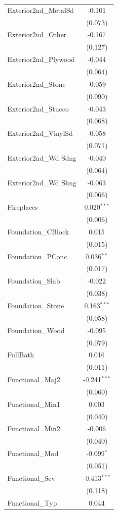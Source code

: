\begin{table}[!htbp]
\begin{tabular}{@{\extracolsep{5pt}}lc}
 Exterior2nd_MetalSd & -0.101$^{}$ \\
& (0.073) \\
 Exterior2nd_Other & -0.167$^{}$ \\
& (0.127) \\
 Exterior2nd_Plywood & -0.044$^{}$ \\
& (0.064) \\
 Exterior2nd_Stone & -0.059$^{}$ \\
& (0.090) \\
 Exterior2nd_Stucco & -0.043$^{}$ \\
& (0.068) \\
 Exterior2nd_VinylSd & -0.058$^{}$ \\
& (0.071) \\
 Exterior2nd_Wd Sdng & -0.040$^{}$ \\
& (0.064) \\
 Exterior2nd_Wd Shng & -0.063$^{}$ \\
& (0.066) \\
 Fireplaces & 0.020$^{***}$ \\
& (0.006) \\
 Foundation_CBlock & 0.015$^{}$ \\
& (0.015) \\
 Foundation_PConc & 0.036$^{**}$ \\
& (0.017) \\
 Foundation_Slab & -0.022$^{}$ \\
& (0.038) \\
 Foundation_Stone & 0.163$^{***}$ \\
& (0.058) \\
 Foundation_Wood & -0.095$^{}$ \\
& (0.079) \\
 FullBath & 0.016$^{}$ \\
& (0.011) \\
 Functional_Maj2 & -0.241$^{***}$ \\
& (0.060) \\
 Functional_Min1 & 0.003$^{}$ \\
& (0.040) \\
 Functional_Min2 & -0.006$^{}$ \\
& (0.040) \\
 Functional_Mod & -0.099$^{*}$ \\
& (0.051) \\
 Functional_Sev & -0.413$^{***}$ \\
& (0.118) \\
 Functional_Typ & 0.044$^{}$ \\

\end{tabular}
\end{table}

